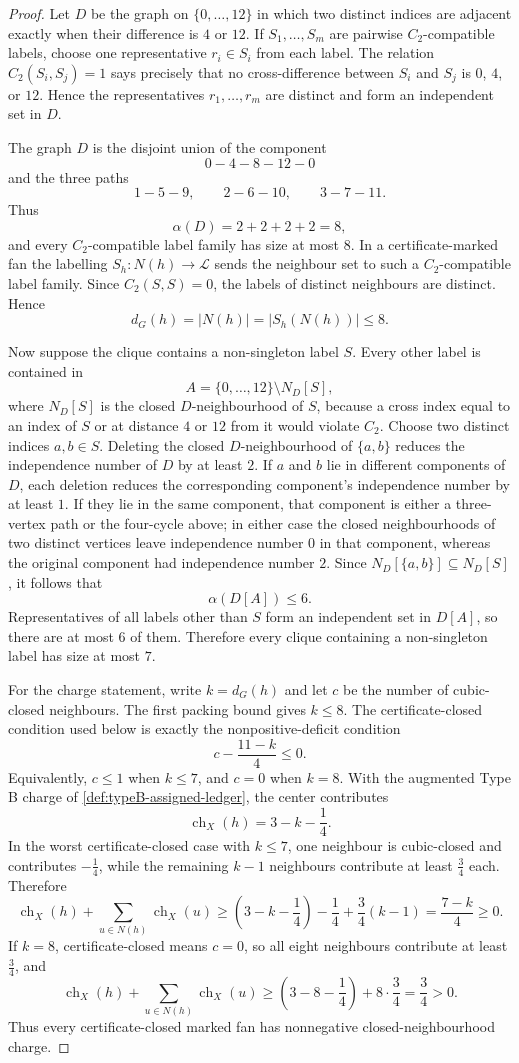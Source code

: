 \documentclass[11pt]{article}
\newcommand{\labels}{\mathcal L}
\newcommand{\ch}{\operatorname{ch}}
\begin{document}
\begin{proof}
Let $D$ be the graph on $\{0,\ldots,12\}$ in which two distinct indices are
adjacent exactly when their difference is $4$ or $12$.  If
$S_1,\ldots,S_m$ are pairwise $C_2$-compatible labels, choose one representative
$r_i\in S_i$ from each label.  The relation $C_2(S_i,S_j)=1$ says precisely
that no cross-difference between $S_i$ and $S_j$ is $0$, $4$, or $12$.  Hence
the representatives $r_1,\ldots,r_m$ are distinct and form an independent set
in $D$.

The graph $D$ is the disjoint union of the component
\[
0-4-8-12-0
\]
and the three paths
\[
1-5-9,\qquad 2-6-10,\qquad 3-7-11 .
\]
Thus
\[
\alpha(D)=2+2+2+2=8,
\]
and every $C_2$-compatible label family has size at most $8$.  In a
certificate-marked fan the labelling $S_h:N(h)\to\labels$ sends the neighbour
set to such a $C_2$-compatible label family.  Since \(C_2(S,S)=0\), the labels
of distinct neighbours are distinct.  Hence
\[
d_G(h)=|N(h)|=|S_h(N(h))|\le8 .
\]

Now suppose the clique contains a non-singleton label $S$.  Every other label
is contained in
\[
A=\{0,\ldots,12\}\setminus N_D[S],
\]
where $N_D[S]$ is the closed $D$-neighbourhood of $S$, because a cross index
equal to an index of $S$ or at distance $4$ or $12$ from it would violate
$C_2$.  Choose two distinct indices $a,b\in S$.  Deleting the closed
$D$-neighbourhood of $\{a,b\}$ reduces the independence number of $D$ by at
least $2$.  If $a$ and $b$ lie in different components of $D$, each deletion
reduces the corresponding component's independence number by at least $1$.  If
they lie in the same component, that component is either a three-vertex path or
the four-cycle above; in either case the closed neighbourhoods of two distinct
vertices leave independence number $0$ in that component, whereas the original
component had independence number $2$.  Since
$N_D[\{a,b\}]\subseteq N_D[S]$, it follows that
\[
\alpha(D[A])\le6.
\]
Representatives of all labels other than $S$ form an independent set in
$D[A]$, so there are at most $6$ of them.  Therefore every clique containing a
non-singleton label has size at most $7$.

For the charge statement, write $k=d_G(h)$ and let $c$ be the number of
cubic-closed neighbours.  The first packing bound gives $k\le8$.  The
certificate-closed condition used below is exactly the nonpositive-deficit
condition
\[
c-\frac{11-k}{4}\le0.
\]
Equivalently, $c\le1$ when $k\le7$, and $c=0$ when $k=8$.  With the augmented
Type B charge of \cref{def:typeB-assigned-ledger}, the center contributes
\[
\ch_X(h)=3-k-\frac14.
\]
In the worst certificate-closed case with $k\le7$, one neighbour is
cubic-closed and contributes $-\tfrac14$, while the remaining $k-1$ neighbours
contribute at least $\tfrac34$ each.  Therefore
\[
\ch_X(h)+\sum_{u\in N(h)}\ch_X(u)
\ge
\left(3-k-\frac14\right)-\frac14+\frac34(k-1)
=\frac{7-k}{4}\ge0 .
\]
If $k=8$, certificate-closed means $c=0$, so all eight neighbours contribute at
least $\tfrac34$, and
\[
\ch_X(h)+\sum_{u\in N(h)}\ch_X(u)
\ge
\left(3-8-\frac14\right)+8\cdot\frac34
=\frac34>0 .
\]
Thus every certificate-closed marked fan has nonnegative
closed-neighbourhood charge.
\end{proof}
\end{document}

